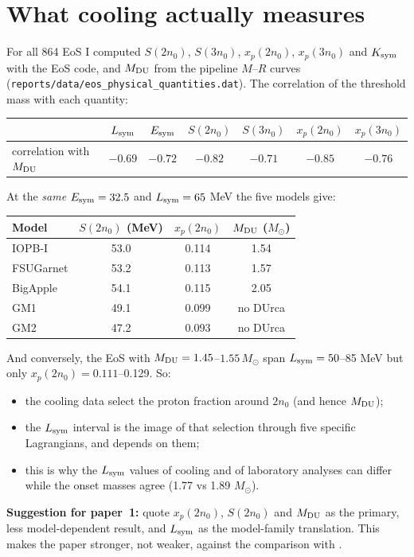 \documentclass[11pt,a4paper]{article}
\newcommand{\Esym}{E_{\rm sym}}
\newcommand{\Lsym}{L_{\rm sym}}
\newcommand{\Msun}{M_\odot}
\begin{document}
\section{What cooling actually measures}\label{sec:what}
For all 864 EoS I computed $S(2n_0)$, $S(3n_0)$, $x_p(2n_0)$, $x_p(3n_0)$ and $K_{\rm sym}$ with the EoS code, and $M_{\rm DU}$ from the pipeline $M$--$R$ curves (\texttt{reports/data/eos\_physical\_quantities.dat}). The correlation of the threshold mass with each quantity:
\begin{center}
\begin{tabular}{lcccccc}
\toprule
 & $\Lsym$ & $\Esym$ & $S(2n_0)$ & $S(3n_0)$ & $x_p(2n_0)$ & $x_p(3n_0)$\\
\midrule
correlation with $M_{\rm DU}$ & $-0.69$ & $-0.72$ & $-0.82$ & $-0.71$ & $\mathbf{-0.85}$ & $-0.76$\\
\bottomrule
\end{tabular}
\end{center}
At the \emph{same} $\Esym=32.5$ and $\Lsym=65$ MeV the five models give:
\begin{center}
\begin{tabular}{lccc}
\toprule
Model & $S(2n_0)$ (MeV) & $x_p(2n_0)$ & $M_{\rm DU}$ ($\Msun$)\\
\midrule
IOPB-I & 53.0 & 0.114 & 1.54\\
FSUGarnet & 53.2 & 0.113 & 1.57\\
BigApple & 54.1 & 0.115 & 2.05\\
GM1 & 49.1 & 0.099 & no DUrca\\
GM2 & 47.2 & 0.093 & no DUrca\\
\bottomrule
\end{tabular}
\end{center}
And conversely, the EoS with $M_{\rm DU}=1.45$--$1.55\,\Msun$ span $\Lsym=50$--85 MeV but only $x_p(2n_0)=0.111$--0.129. So:
\begin{itemize}
\item the cooling data select the proton fraction around $2n_0$ (and hence $M_{\rm DU}$);
\item the $\Lsym$ interval is the image of that selection through five specific Lagrangians, and depends on them;
\item this is why the $\Lsym$ values of cooling and of laboratory analyses can differ while the onset masses agree (1.77 vs 1.89 $\Msun$).
\end{itemize}
\textbf{Suggestion for paper~1:} quote $x_p(2n_0)$, $S(2n_0)$ and $M_{\rm DU}$ as the primary, less model-dependent result, and $\Lsym$ as the model-family translation. This makes the paper stronger, not weaker, against the comparison with \cite{Montefusco2026}.
\end{document}
